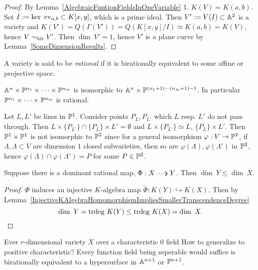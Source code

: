     \begin{proof}
        By Lemma~\ref{AlgebraicFuntionFieldsInOneVariable} 1. $K(V)=K(a,b)$. Set $I:= \ker \ \mathrm{ev}_{a,b}\subset K[x,y]$, which is a prime ideal. Then $V':= V(I)\subset \mathbb{A}^2$ is a variety and $K(V')= Q(\Gamma(V'))= Q(K[x,y]/I)\simeq K(a,b)=K(V)$, hence $V\sim_{\mathrm{bir}} V'$. Then $\dim \ V' = 1$, hence $V'$ is a plane curve by Lemma~\ref{SomeDimensionResults}.
    \end{proof}
    \begin{definition}
        A variety is said to be \textit{rational} if it is birationally equivalent to some affine or projective space. 
    \end{definition}
    \begin{example}
        $\mathbb{A}^n\times\mathbb{P}^{n_1}\times \cdots \times \mathbb{P}^{n_m}$ is isomorphic to $\mathbb{A}^n \times \mathbb{P}^{(n_1+1)\cdots (n_m+1)-1}$. In particular $\mathbb{P}^{n_1}\times \cdots \times \mathbb{P}^{n_m}$ is rational.
    \end{example}
    \begin{example}
        Let $L,L'$ be lines in $\mathbb{P}^1$. Consider points $P_L,P_{L'}$ which $L$ resp. $L'$ do not pass through. Then $L\times \{P_{L'}\}\cap \{P_L\}\times L'=\emptyset$ and $L\times \{P_{L'}\}\simeq L$, $\{P_L\}\times L'$. Then $\mathbb{P}^1\times \mathbb{P}^1$ is not isomorphic to $\mathbb{P}^2$ since for a general isomorphism $\varphi: V\rightarrow \mathbb{P}^2$, if $\Lambda,\Lambda\subset V$ are dimension $1$ closed subvarieties, then so are $\varphi(\Lambda),\varphi(\Lambda')$ in $\mathbb{P}^2$, hence $\varphi(\Lambda)\cap \varphi(\Lambda')=P$ for some $P\in \mathbb{P}^2$.
    \end{example}
    \begin{proposition}
        Suppose there is a dominant rational map, $\Phi: X\dottedarrow Y$. Then $\dim\ Y \leq \dim \ X$.
    \end{proposition}
    \begin{proof}
        $\Phi$ induces an injective $K$-algebra map $\widetilde{\Phi}: K(Y)\hookrightarrow K(X)$. Then by Lemma~\ref{InjectiveKAlgebraHomomorphismImpliesSmallerTranscendenceDegree} 
        $$\dim \ Y = \mathrm{trdeg }\ K(Y)\leq \mathrm{trdeg }\ K(X) = \dim \ X.$$
    \end{proof}
    \begin{proposition}
        Ever $r$-dimensional variety $X$ over a characteristic $0$ field {\Large How to generalize to positive characteristic? Every function field being seperable would suffice} is birationally equivalent to a hypersurface in $\mathbb{A}^{n+1}$ or $\mathbb{P}^{n+1}$.
    \end{proposition}
